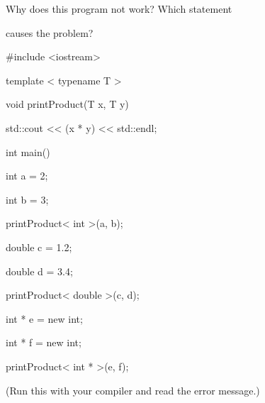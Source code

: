 Why does this program not work? Which statement

causes the problem?



\begin{consolethree}[escapeinside=||]

#include <iostream>



template < typename T >

void printProduct(T x, T y)

{

    std::cout << (x * y) << std::endl;

}



int main()

{

    int a = 2;

    int b = 3;

    printProduct< int >(a, b);



    double c = 1.2;

    double d = 3.4;

    printProduct< double >(c, d);



    int * e = new int;

    int * f = new int;

    printProduct< int * >(e, f);

}

\end{consolethree}



(Run this with your compiler and read the error message.)

